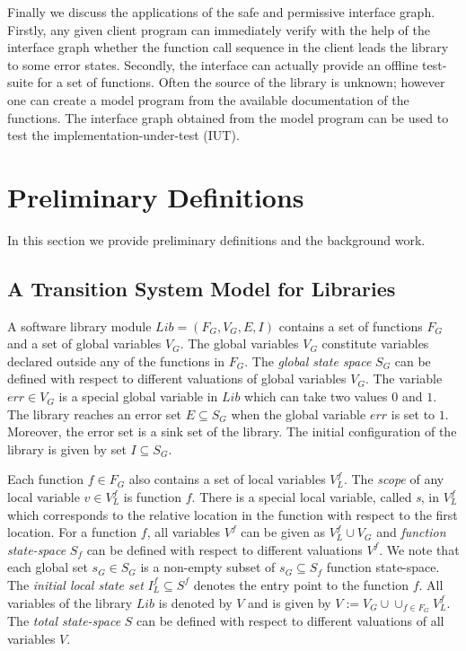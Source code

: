 \documentclass{llncs}
\begin{document}
 Finally we discuss the applications of the safe and permissive interface graph.
 Firstly, any given client program can immediately verify with the help of the interface graph whether the function call sequence in the client leads the library to some error states.
Secondly, the interface can actually provide an offline test-suite for a set of functions.
Often the source of the library is unknown; however one can create a model program from the
available documentation of the functions.
The interface graph obtained from the model program can be used to test the
implementation-under-test (IUT).






















    
   


  


\section{Preliminary Definitions}\label{def}
In this section we provide preliminary definitions and the background work.
\subsection{A Transition System Model for Libraries}
A software library module $Lib = (F_G,V_G, E, I)$ contains a set of functions $F_G$ and a set of 
global variables $V_G$. 
The global variables $V_G$ constitute variables declared outside any of the functions in $F_G$.
The {\em global state space} $S_G$ can be defined with respect to different valuations of global variables $V_G$. 
The variable $err \in V_G$ is a special global variable in $Lib$ which can take two values $0$
and $1$.
The library reaches an error set  $E \subseteq S_G$ when the global variable $err$ is set to $1$. 
Moreover, the error set is a sink set of the library.
The initial configuration of the library is given by set $I \subseteq S_G$.

Each function $f \in F_G$ also contains a set of local variables $V^f_L$.
The {\em scope} of any local variable $v \in V^f_L$ is function $f$.
There is a special local variable, called {\em s}, in $V^f_L$ which corresponds to the relative location
in the function with respect to the first location. 
For a function $f$, all variables $V^f$ can be given as $V^f_L \cup V_G$ and 
 {\em function state-space} $S_f$ can be defined with respect to different valuations $V^f$. 
 We note that each global set $s_G \in S_G$ is a non-empty subset of $s_G \subseteq S_f$
 function state-space. 
 The {\em initial local state set} $I^f_L \subseteq S^f$ denotes the entry point to the function $f$. 
All variables of the library $Lib$ is denoted by $V$ and is given by $V {:=} V_G \cup \cup_{f \in F_G} V^f_L$.
The {\em total state-space} $S$ can be defined with respect to different valuations of all variables $V$.   
\end{document}
